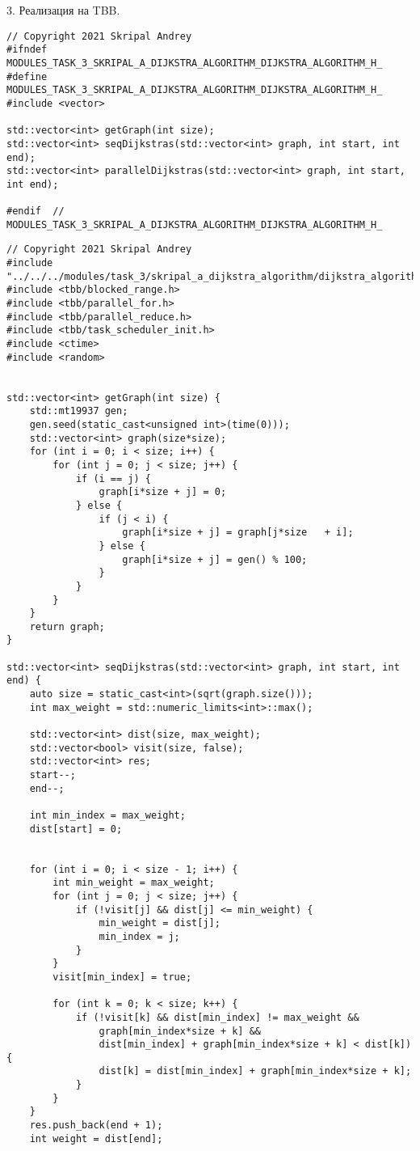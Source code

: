 \documentclass{report}
\begin{document}
\par 3. Реализация на TBB.
\begin{lstlisting}
// Copyright 2021 Skripal Andrey
#ifndef MODULES_TASK_3_SKRIPAL_A_DIJKSTRA_ALGORITHM_DIJKSTRA_ALGORITHM_H_
#define MODULES_TASK_3_SKRIPAL_A_DIJKSTRA_ALGORITHM_DIJKSTRA_ALGORITHM_H_
#include <vector>

std::vector<int> getGraph(int size);
std::vector<int> seqDijkstras(std::vector<int> graph, int start, int end);
std::vector<int> parallelDijkstras(std::vector<int> graph, int start, int end);

#endif  // MODULES_TASK_3_SKRIPAL_A_DIJKSTRA_ALGORITHM_DIJKSTRA_ALGORITHM_H_

\end{lstlisting}
\begin{lstlisting}
// Copyright 2021 Skripal Andrey
#include "../../../modules/task_3/skripal_a_dijkstra_algorithm/dijkstra_algorithm.h"
#include <tbb/blocked_range.h>
#include <tbb/parallel_for.h>
#include <tbb/parallel_reduce.h>
#include <tbb/task_scheduler_init.h>
#include <ctime>
#include <random>


std::vector<int> getGraph(int size) {
    std::mt19937 gen;
    gen.seed(static_cast<unsigned int>(time(0)));
    std::vector<int> graph(size*size);
    for (int i = 0; i < size; i++) {
        for (int j = 0; j < size; j++) {
            if (i == j) {
                graph[i*size + j] = 0;
            } else {
                if (j < i) {
                    graph[i*size + j] = graph[j*size   + i];
                } else {
                    graph[i*size + j] = gen() % 100;
                }
            }
        }
    }
    return graph;
}

std::vector<int> seqDijkstras(std::vector<int> graph, int start, int end) {
    auto size = static_cast<int>(sqrt(graph.size()));
    int max_weight = std::numeric_limits<int>::max();

    std::vector<int> dist(size, max_weight);
    std::vector<bool> visit(size, false);
    std::vector<int> res;
    start--;
    end--;

    int min_index = max_weight;
    dist[start] = 0;


    for (int i = 0; i < size - 1; i++) {
        int min_weight = max_weight;
        for (int j = 0; j < size; j++) {
            if (!visit[j] && dist[j] <= min_weight) {
                min_weight = dist[j];
                min_index = j;
            }
        }
        visit[min_index] = true;

        for (int k = 0; k < size; k++) {
            if (!visit[k] && dist[min_index] != max_weight &&
                graph[min_index*size + k] &&
                dist[min_index] + graph[min_index*size + k] < dist[k]) {
                dist[k] = dist[min_index] + graph[min_index*size + k];
            }
        }
    }
    res.push_back(end + 1);
    int weight = dist[end];


\end{lstlisting}
\end{document}

